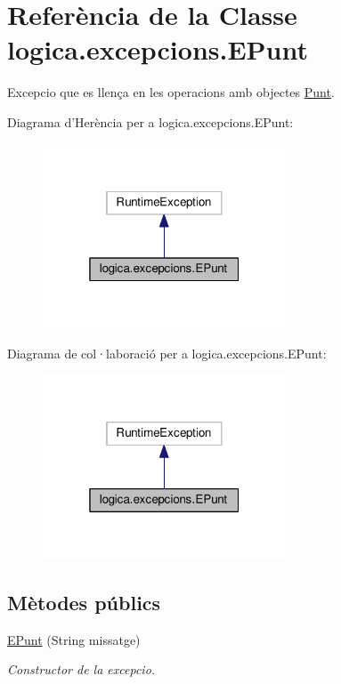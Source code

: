\hypertarget{classlogica_1_1excepcions_1_1_e_punt}{\section{Referència de la Classe logica.\+excepcions.\+E\+Punt}
\label{classlogica_1_1excepcions_1_1_e_punt}
}


Excepcio que es llença en les operacions amb objectes \hyperlink{classlogica_1_1_punt}{Punt}.  




Diagrama d'Herència per a logica.\+excepcions.\+E\+Punt\+:\nopagebreak
\begin{figure}[H]
\begin{center}
\leavevmode
\includegraphics[width=205pt]{classlogica_1_1excepcions_1_1_e_punt__inherit__graph}
\end{center}
\end{figure}


Diagrama de col·laboració per a logica.\+excepcions.\+E\+Punt\+:\nopagebreak
\begin{figure}[H]
\begin{center}
\leavevmode
\includegraphics[width=205pt]{classlogica_1_1excepcions_1_1_e_punt__coll__graph}
\end{center}
\end{figure}
\subsection*{Mètodes públics}
\begin{DoxyCompactItemize}
\item 
\hyperlink{classlogica_1_1excepcions_1_1_e_punt_a7ec7da82aea156caf4614ad9d8fe3272}{E\+Punt} (String missatge)
\begin{DoxyCompactList}\small\item\em Constructor de la excepcio. \end{DoxyCompactList}\end{DoxyCompactItemize}


